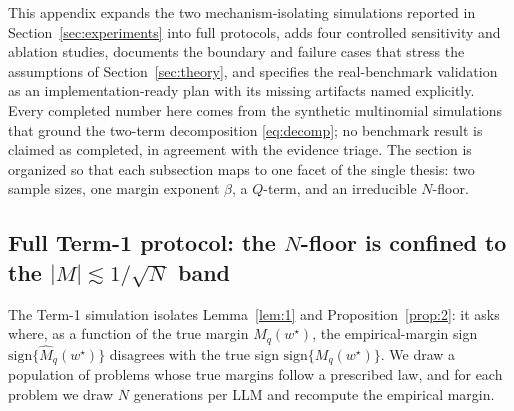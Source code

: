 \documentclass{article} %
\providecommand{\Mhat}{\widehat{M}}
\providecommand{\wstar}{w^{\star}}
\providecommand{\sign}{\mathrm{sign}}
\begin{document}
This appendix expands the two mechanism-isolating simulations reported in
Section~\ref{sec:experiments} into full protocols, adds four controlled
sensitivity and ablation studies, documents the boundary and failure cases
that stress the assumptions of Section~\ref{sec:theory}, and specifies the
real-benchmark validation as an implementation-ready plan with its missing
artifacts named explicitly.  Every completed number here comes from the
synthetic multinomial simulations that ground the two-term decomposition
\eqref{eq:decomp}; no benchmark result is claimed as completed, in agreement
with the evidence triage.  The section is organized so that each subsection
maps to one facet of the single thesis: two sample sizes, one margin
exponent $\beta$, a $Q$-term, and an irreducible $N$-floor.

\subsection{Full Term-1 protocol: the $N$-floor is confined to the
\texorpdfstring{$|M|\lesssim 1/\sqrt N$}{|M| < 1/sqrt N} band}
\label{app:exp-channel1}

The Term-1 simulation isolates Lemma~\ref{lem:1} and
Proposition~\ref{prop:2}: it asks where, as a function of the true margin
$M_q(\wstar)$, the empirical-margin sign $\sign\{\Mhat_q(\wstar)\}$ disagrees
with the true sign $\sign\{M_q(\wstar)\}$.  We draw a population of problems
whose true margins follow a prescribed law, and for each problem we draw $N$
generations per LLM and recompute the empirical margin.
\end{document}
